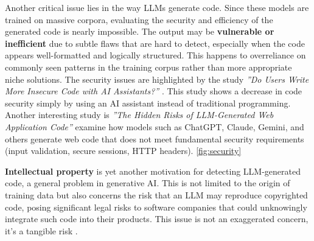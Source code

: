 \vspace{1\baselineskip}
\noindent

Another critical issue lies in the way LLMs generate code. 
Since these models are trained on massive corpora, 
evaluating the security and efficiency of the generated 
code is nearly impossible. The output may be 
\textbf{vulnerable or inefficient} 
due to subtle flaws that are hard to detect, especially 
when the code appears well-formatted and logically 
structured. 
This happens to overreliance on 
commonly seen patterns in the training corpus rather 
than more appropriate niche solutions.
The security issues are highlighted by the study
\textit{”Do Users Write More Insecure Code with AI Assistants?”} 
\cite{perry2022users}. This study shows a decrease in
code security simply by using an AI assistant instead of
traditional programming. Another interesting study is 
\textit{”The Hidden Risks of LLM-Generated Web
Application Code”} \cite{dora2025hidden} 
examine how models such as ChatGPT, Claude, Gemini, and others generate 
web code that does not meet fundamental security requirements 
(input validation, secure sessions, HTTP headers).
\ref{fig:security}


\vspace{1\baselineskip}
\noindent

\textbf{Intellectual property} is yet another motivation 
for detecting LLM-generated code, a general problem 
in generative AI. This is not limited to the origin 
of training data but also concerns the risk that an 
LLM may reproduce copyrighted code, posing 
significant legal risks to software companies 
that could unknowingly integrate such code into 
their products.
This issue is not an exaggerated concern, 
it's a tangible risk \cite{DoeVGitHub2024}.


